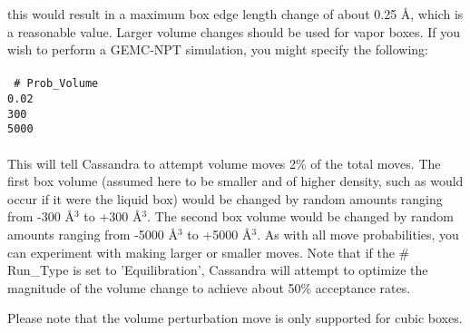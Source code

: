 this would result in a maximum box edge length change of about 0.25
\AA, which is a reasonable value.  
Larger volume changes should be used for vapor boxes. 
%
If you wish to perform a GEMC-NPT simulation, you might specify the
following: \\ \\ 
%                                                                                                                                           
\texttt{
\# Prob\_Volume \\
0.02 \\
300 \\
5000} \\ \\
%
This will tell Cassandra to attempt volume moves 2\% of the
total moves. The first box volume (assumed here to be smaller and of higher
density, such as would occur if it were the liquid box) would be
changed by random amounts ranging from 
-300 \AA $^3$ to +300 \AA $^3$. The second box volume would be
changed by random amounts ranging from
-5000 \AA $^3$ to +5000 \AA $^3$. As with all move probabilities, you
can experiment with making 
larger or smaller moves. Note that if the \# Run\_Type is set
to 'Equilibration', Cassandra will attempt to optimize the magnitude of
the volume change to achieve about 50\% acceptance rates. 

Please note that the volume perturbation move is only supported for cubic boxes. 
%                                                                                                                                           
%                
%
%
